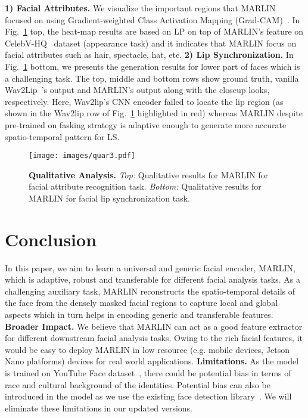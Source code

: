 \documentclass[10pt,twocolumn,letterpaper]{article}
\begin{document}
\noindent \textbf{1) Facial Attributes.} We visualize the important regions that MARLIN focused on using Gradient-weighted Class Activation Mapping (Grad-CAM)~\cite{selvarajuGradCAM2017}. In Fig.~\ref{fig:grad_cam} top, the heat-map results are based on LP on top of MARLIN's feature on CelebV-HQ~\cite{zhuCelebVHQ2022} dataset (appearance task) and it indicates that MARLIN focus on facial attributes such as hair, spectacle, hat, etc. 
\textbf{2) Lip Synchronization.} In Fig.~\ref{fig:grad_cam} bottom, we presents the generation results for lower part of faces which is a challenging task. The top, middle and bottom rows show ground truth, vanilla Wav2Lip~\cite{prajwalLip2020}'s output and MARLIN's output along with the closeup looks, respectively. Here, Wav2lip's CNN encoder failed to locate the lip region (as shown in the Wav2lip row of Fig.~\ref{fig:grad_cam} highlighted in red) whereas MARLIN despite pre-trained on fasking strategy is adaptive enough to generate more accurate spatio-temporal pattern for LS. 

\begin{figure}
    \centering
    \texttt{[image: images/quar3.pdf]}
    \caption{\textbf{Qualitative Analysis.} \textit{Top:} Qualitative results for MARLIN for facial attribute recognition task. \textit{Bottom:} Qualitative results for MARLIN for facial lip synchronization task.}
    \label{fig:grad_cam}
    \vspace{-7mm}
\end{figure}

\vspace{-1mm}
\section{Conclusion}
\vspace{-1mm}
In this paper, we aim to learn a universal and generic facial encoder, MARLIN, which is adaptive, robust and transferable for different facial analysis tasks. As a challenging auxiliary task, MARLIN reconstructs the spatio-temporal details of the face from the densely masked facial regions to capture local and global aspects which in turn helps in encoding generic and transferable features. 
\textbf{Broader Impact.} We believe that MARLIN can act as a good feature extractor for different downstream facial analysis tasks. Owing to the rich facial features, it would be easy to deploy MARLIN in low resource (e.g. mobile devices, Jetson Nano platforms) devices for real world applications. \textbf{Limitations.} As the model is trained on YouTube Face dataset~\cite{wolfFace2011}, there could be potential bias in terms of race and cultural background of the identities. Potential bias can also be introduced in the model as we use the existing face detection library~\cite{wangFaceXZoo2021}. We will eliminate these limitations in our updated versions.
\end{document}
